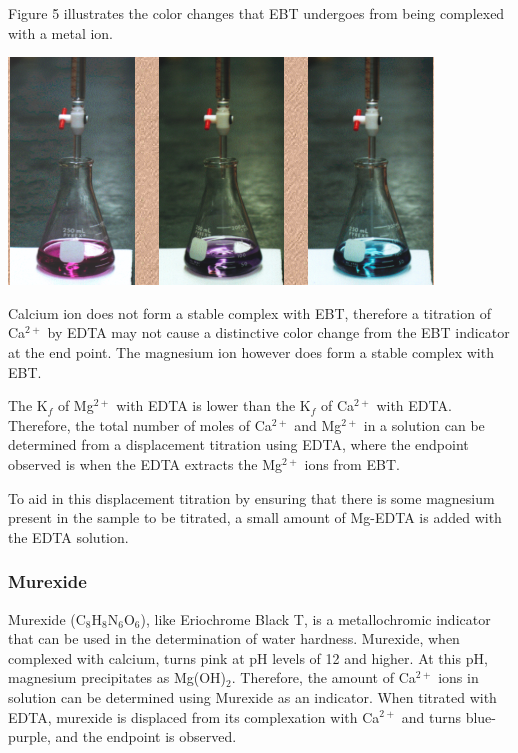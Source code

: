 \documentclass{article}
\begin{document}
Figure 5 illustrates the color changes that EBT undergoes from being complexed
with a metal ion.

\begin{center}
        \includegraphics[scale=0.5]{EBT_color}
\end{center}

Calcium ion does not form a stable complex with EBT, therefore a titration of Ca$^{2+}$ by EDTA may
not cause a distinctive color change from the EBT indicator at the end point.
The magnesium ion however does form a stable complex with EBT.

The K$_f$ of Mg$^{2+}$ with EDTA is lower than the K$_f$ of Ca$^{2+}$ with
EDTA. Therefore, the total number of moles of Ca$^{2+}$ and Mg$^{2+}$ in a solution
can be determined from a displacement titration using EDTA, where the endpoint
observed is when the EDTA extracts the Mg$^{2+}$ ions from EBT.

To aid in this displacement titration by ensuring that there is some magnesium
present in the sample to be titrated, a small amount of Mg-EDTA is added with
the EDTA solution.

\subsubsection {Murexide}

Murexide (C$_8$H$_8$N$_6$O$_6$), like Eriochrome Black T, is a metallochromic indicator that can be
used in the determination of water hardness. Murexide, when complexed with calcium, turns pink at pH
levels of 12 and higher. At this pH, magnesium precipitates as Mg(OH)$_2$. Therefore, the amount of
Ca$^{2+}$ ions in solution can be determined using Murexide as an indicator. \cite{wroclaw} 
When titrated with EDTA, murexide is displaced from its complexation with Ca$^{2+}$ and turns
blue-purple, and the endpoint is observed.
\end{document}
